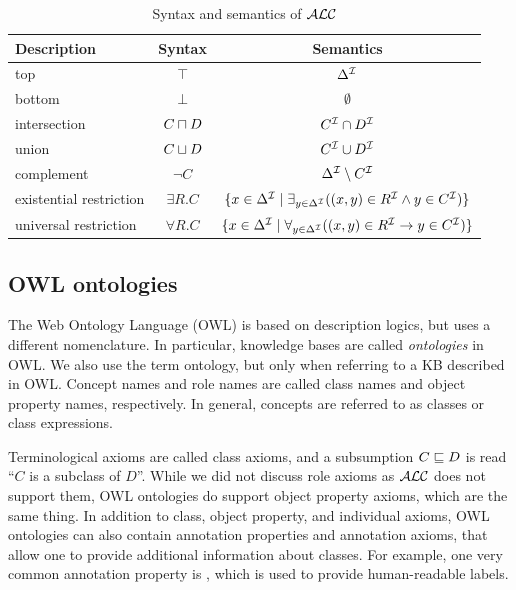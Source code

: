 \begin{table}
\centering
\caption{Syntax and semantics of $\mathcal{ALC}$}
\label{tab:alc}
\begin{tabular}{lcc}
\toprule
\multicolumn{1}{l}{Description} & \multicolumn{1}{c}{Syntax} & \multicolumn{1}{c}{Semantics} \\
\midrule
top             & $\top$          & $\Delta^\mathcal{I}$ \\
bottom          & $\bot$          & $\emptyset$ \\
intersection    & $C \sqcap D$    & $C^{\mathcal{I}} \cap D^{\mathcal{I}}$ \\
union           & $C \sqcup D$     & $C^{\mathcal{I}} \cup D^{\mathcal{I}}$ \\
complement      & $\lnot C$       & $\Delta^\mathcal{I} \setminus C^{\mathcal{I}}$ \\
existential restriction & $\exists R . C$ & $\{ x \in \Delta^\mathcal{I} \mid \exists_{y \in \Delta^\mathcal{I}} ( (x, y) \in R^{\mathcal{I}} \land y \in C^{\mathcal{I}} ) \}$ \\
universal restriction   & $\forall R . C$ & $\{ x \in \Delta^\mathcal{I} \mid \forall_{y \in \Delta^\mathcal{I}} ( (x, y) \in R^{\mathcal{I}} \rightarrow y \in C^{\mathcal{I}} ) \}$ \\
\bottomrule
\end{tabular}
\end{table}

\subsection{OWL ontologies} 

The Web Ontology Language (OWL) is based on description logics, but uses a different nomenclature.
In particular, knowledge bases are called \emph{ontologies} in OWL.
We also use the term ontology, but only when referring to a KB described in OWL.
Concept names and role names are called class names and object property names, respectively.
In general, concepts are referred to as classes or class expressions.

Terminological axioms are called class axioms, and a subsumption $C \sqsubseteq D$ is read ``$C$ is a subclass of $D$''.
While we did not discuss role axioms as $\mathcal{ALC}$ does not support them, OWL ontologies do support object property axioms, which are the same thing.
In addition to class, object property, and individual axioms, OWL ontologies can also contain annotation properties and annotation axioms, that allow one to provide additional information about classes.
For example, one very common annotation property is , which is used to provide human-readable labels.

